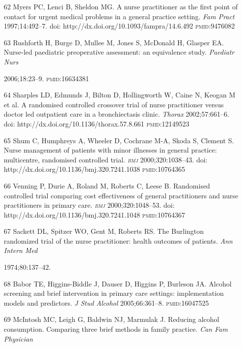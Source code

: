 \documentclass{article}
\begin{document}
\begin{itemize}
\item[62] Myers PC, Lenci B, Sheldon MG. A nurse practitioner as the first point
of contact
for urgent medical problems in a general practice setting. \textit{Fam Pract}
1997;14:492–7.
doi: http://dx.doi.org/10.1093/fampra/14.6.492 \textsc{pmid}:9476082

\item[63] Rushforth H, Burge D, Mullee M, Jones S, McDonald H, Glasper EA.
Nurse-led
paediatric preoperative assessment: an equivalence study. \textit{Paediatr Nurs}

2006;18:23–9. \textsc{pmid}:16634381

\item[64] Sharples LD, Edmunds J, Bilton D, Hollingworth W, Caine N, Keogan M et
al. A
randomised controlled crossover trial of nurse practitioner versus doctor led
outpatient care in a
bronchiectasis clinic. \textit{Thorax}
2002;57:661–6. doi:
http://dx.doi.org/10.1136/thorax.57.8.661 \textsc{pmid}:12149523

\item[65] Shum C, Humphreys A, Wheeler D, Cochrane M-A, Skoda S, Clement S.
Nurse management
of patients with minor illnesses in general practice: multicentre, randomised
controlled trial.
\textit{\textsc{bmj}}
2000;320:1038–43. doi: http://dx.doi.org/10.1136/bmj.320.7241.1038
\textsc{pmid}:10764365

\item[66] Venning P, Durie A, Roland M, Roberts C, Leese B. Randomised
controlled trial
comparing cost effectiveness of general practitioners and nurse practitioners in
primary care.
\textit{\textsc{bmj}}
2000;320:1048–53. doi: http://dx.doi.org/10.1136/bmj.320.7241.1048
\textsc{pmid}:10764367

\item[67] Sackett DL, Spitzer WO, Gent M, Roberts RS. The Burlington randomized
trial of the
nurse practitioner: health outcomes of patients. \textit{Ann Intern Med}

1974;80:137–42.

\item[68] Babor TE, Higgins-Biddle J, Dauser D, Higgins P, Burleson JA. Alcohol
screening and
brief intervention in primary care settings: implementation models and
predictors. \textit{J Stud
Alcohol}
2005;66:361–8. \textsc{pmid}:16047525

\item[69] McIntosh MC, Leigh G, Baldwin NJ, Marmulak J. Reducing alcohol
consumption.
Comparing three brief methods in family practice. \textit{Can Fam Physician}


\end{itemize}
\end{document}
